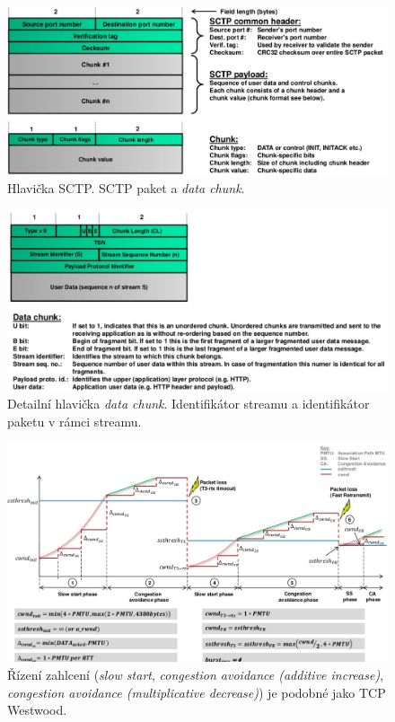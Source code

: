 \begin{figure}[H]
    \centering
    \includegraphics[width=1\linewidth]{sctp_header_1.png}
    \caption{Hlavička SCTP. SCTP paket a \textit{data chunk}.}
\end{figure}

\begin{figure}[H]
    \centering
    \includegraphics[width=1\linewidth]{sctp_header_2.png}
    \caption{Detailní hlavička \textit{data chunk}. Identifikátor streamu a identifikátor paketu v rámci streamu.}
\end{figure}


\begin{figure}[H]
    \centering
    \includegraphics[width=1\linewidth]{sctp_rizeni_zahlceni.png}
    \caption{Řízení zahlcení (\textit{slow start}, \textit{congestion avoidance (additive increase)}, \textit{congestion avoidance (multiplicative decrease)}) je podobné jako TCP Westwood.}
\end{figure}

